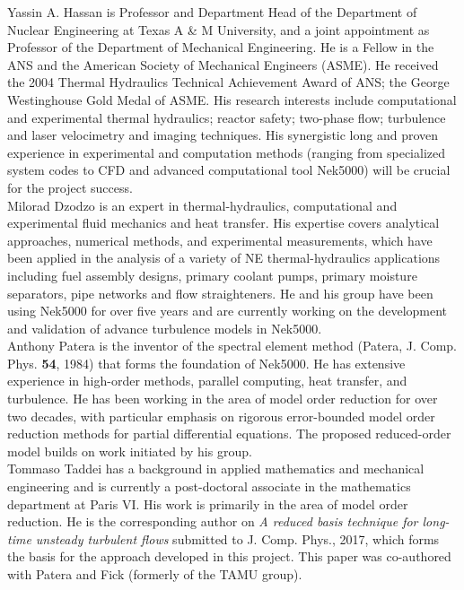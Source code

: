 Yassin A. Hassan is Professor and Department Head of the Department of
Nuclear Engineering at Texas A \& M University, and a joint appointment as
Professor of the Department of Mechanical Engineering. He is a Fellow in the
ANS and the American Society of Mechanical Engineers (ASME). He received the
2004 Thermal Hydraulics Technical Achievement Award of ANS; the George
Westinghouse Gold Medal of ASME. His research interests include computational
and experimental thermal hydraulics; reactor safety; two-phase flow;
turbulence and laser velocimetry and imaging techniques. His synergistic long
and proven experience in experimental and computation methods (ranging from
specialized system codes to CFD and advanced computational tool Nek5000) will
be crucial for the project success. 
\\


Milorad Dzodzo is an expert in thermal-hydraulics, computational and
experimental fluid mechanics and heat transfer.
  His expertise covers analytical approaches, numerical methods,
  and experimental measurements, which have been applied in the
  analysis of a variety of NE thermal-hydraulics applications including
  fuel assembly designs, primary coolant pumps, primary moisture separators, 
   pipe networks and flow straighteners.
  He and his group have been using Nek5000 for over five years and are
  currently working on the development and validation of advance turbulence
  models in Nek5000.
\\


Anthony Patera is the inventor of the spectral element method (Patera,
J. Comp. Phys. {\bf 54}, 1984) that forms the foundation of Nek5000.
  He has extensive experience in high-order methods, parallel computing,
heat transfer, and turbulence.
  He has been working in the area of model order reduction for over two
decades, with particular emphasis on rigorous error-bounded model order
reduction methods for partial differential equations.  
   The proposed reduced-order model builds on work initiated by his
group. 
\\

Tommaso Taddei has a background in applied mathematics and mechanical
engineering and is currently a post-doctoral associate in the mathematics
department at Paris VI.  His work is primarily in the area of model order
reduction.  He is the corresponding author on {\em A reduced basis technique
for long-time unsteady turbulent flows} submitted to J. Comp. Phys., 2017, 
which forms the basis for the approach developed in this project.  This paper
was co-authored with Patera and Fick (formerly of the TAMU group).
\\


